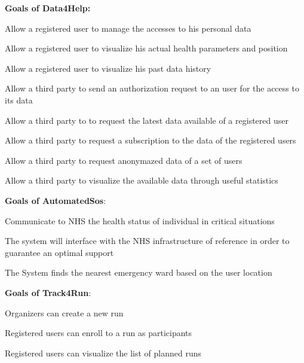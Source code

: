 \textbf{Goals of Data4Help:}
\begin{goalList}
\begin{enumerate}[label={[}G 1.\arabic*{]}]


    \item \label{goal:user1} Allow a registered user to manage the accesses to his personal data
    \item \label{goal:user2}Allow a registered user to visualize his actual health parameters and position
    \item \label{goal:user3}Allow a registered user to visualize his past data history
    
     \item \label{goal:parties1}Allow a third party to send an authorization request to an user for the access to its data
     \item \label{goal:parties2}Allow a third party to to request the latest data available of a registered user
 
    \item \label{goal:parties3}Allow a third party to request a subscription to the data of the registered users
    
    \item \label{goal:parties4}Allow a third party to request anonymazed data of a set of users 
    
    \item \label{goal:parties5}Allow a third party to visualize the available data through useful statistics 


\end{enumerate}
\textbf{Goals of AutomatedSos}:
\begin{enumerate}[label={[}G 2.\arabic*{]}]

\item \label{goal:sos1}Communicate to NHS the health status of individual in critical situations
\item \label{goal:sos2}
The system will interface with the NHS infrastructure of reference in order to guarantee an optimal support
\item \label{goal:sos3}The System finds the nearest emergency ward based on the user location

\end{enumerate}
\newpage

\textbf{Goals of Track4Run}:

\begin{enumerate}[label={[}G 3.\arabic*{]}]

\item \label{goal:run1}
Organizers can create a new run
\item \label{goal:run2}Registered users can enroll to a run as participants
\item \label{goal:run3}Registered users can visualize the list of planned runs


\end{enumerate}
\end{goalList}

